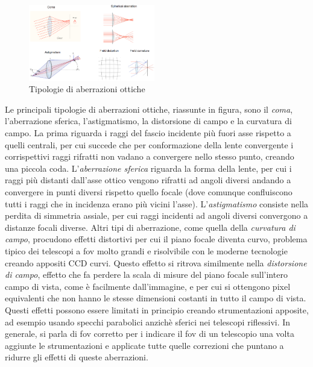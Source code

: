 \documentclass[a4paper,twoside,openany,notitlepage]{book}
\theoremstyle{definition}
\theoremstyle{plain}
\begin{document}
\begin{figure}
	\vspace{-10pt}
	\centering
	\includegraphics[width=0.49\textwidth]{Immagini/Capitolo2/Aberrazioni.png}
	\caption*{Tipologie di aberrazioni ottiche}
	\vspace{-10pt}
\end{figure}

Le principali tipologie di aberrazioni ottiche, riassunte in figura, sono il \textit{coma}, l'aberrazione sferica, l'astigmatismo, la distorsione di campo e la curvatura di campo. La prima riguarda i raggi del fascio incidente più fuori asse rispetto a quelli centrali, per cui succede che per conformazione della lente convergente i corrispettivi raggi rifratti non vadano a convergere nello stesso punto, creando una piccola coda. L'\textit{aberrazione sferica} riguarda la forma della lente, per cui i raggi più distanti dall'asse ottico vengono rifratti ad angoli diversi andando a convergere in punti diversi rispetto quello focale (dove comunque confluiscono tutti i raggi che in incidenza erano più vicini l'asse). L'\textit{astigmatismo} consiste nella perdita di simmetria assiale, per cui raggi incidenti ad angoli diversi convergono a distanze focali diverse. Altri tipi di aberrazione, come quella della \textit{curvatura di campo}, procudono effetti distortivi per cui il piano focale diventa curvo, problema tipico dei telescopi a fov molto grandi e risolvibile con le moderne tecnologie creando appositi CCD curvi. Questo effetto si ritrova similmente nella \textit{distorsione di campo}, effetto che fa perdere la scala di misure del piano focale sull'intero campo di vista, come è facilmente dall'immagine, e per cui si ottengono pixel equivalenti che non hanno le stesse dimensioni costanti in tutto il campo di vista. Questi effetti possono essere limitati in principio creando strumentazioni apposite, ad esempio usando specchi parabolici anzichè sferici nei telescopi riflessivi. In generale, si parla di fov corretto per i indicare il fov di un telescopio una volta aggiunte le strumentazioni e applicate tutte quelle correzioni che puntano a ridurre gli effetti di queste aberrazioni.
\end{document}
